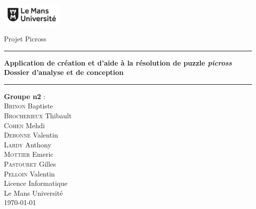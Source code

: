 \documentclass{report}
\begin{document}
\begin{titlepage}


		\begin{spacing}{1.5}
			\begin{minipage}{0.4\textwidth}
					\includegraphics[width=3cm]{logo.png}
			\end{minipage}
			\begin{minipage}{0.5\textwidth}\raggedleft
					Projet Picross\\
			\end{minipage}
						\vspace*{\fill}

		\end{spacing}
	

	
	\begin{center}
		\begin{spacing}{2}
		    \hrule \vspace{1cm}
			\textbf{\Huge Application de création et d'aide à la résolution de puzzle \textit{picross}}\\[0.5cm]
			\textbf{\huge Dossier d'analyse et de conception} \\
			\vspace{1cm}
			\hrule

			\vspace*{\fill}
		\end{spacing}

		\begin{spacing}{1.15}
			\large\textbf{Groupe n\up{o}2} :\\
			\large
			\textsc{Brinon} Baptiste\\
			\textsc{Brocherieux} Thibault\\
			\textsc{Cohen} Mehdi\\
			\textsc{Debonne} Valentin\\
			\textsc{Lardy} Anthony\\
			\textsc{Mottier} Emeric\\
			\textsc{Pastouret} Gilles\\
			\textsc{Pelloin} Valentin\\
			\vspace*{\fill}
			\textnormal{\large Licence Informatique\\ Le Mans Université\\ \today}
		\end{spacing}
		
	\end{center}
\end{titlepage}
\end{document}
